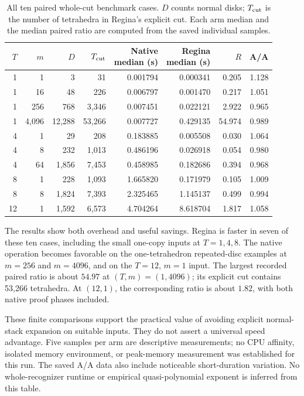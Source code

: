 \begin{table}[htbp]
\centering
\small
\setlength{\tabcolsep}{3.4pt}
\begin{tabular}{@{}rrrrrrrr@{}}
\toprule
$T$ & $m$ & $D$ & $T_{\rm cut}$ &
\shortstack{Native\\median (s)} &
\shortstack{Regina\\median (s)} &
$R$ & A/A \\
\midrule
1 & 1 & 3 & 31 & 0.001794 & 0.000341 & 0.205 & 1.128 \\
1 & 16 & 48 & 226 & 0.006797 & 0.001470 & 0.217 & 1.051 \\
1 & 256 & 768 & 3,346 & 0.007451 & 0.022121 & 2.922 & 0.965 \\
1 & 4,096 & 12,288 & 53,266 & 0.007727 & 0.429135 & 54.974 & 0.989 \\
4 & 1 & 29 & 208 & 0.183885 & 0.005508 & 0.030 & 1.064 \\
4 & 8 & 232 & 1,013 & 0.486196 & 0.026918 & 0.054 & 0.980 \\
4 & 64 & 1,856 & 7,453 & 0.458985 & 0.182686 & 0.394 & 0.968 \\
8 & 1 & 228 & 1,093 & 1.665820 & 0.171979 & 0.105 & 1.009 \\
8 & 8 & 1,824 & 7,393 & 2.325465 & 1.145137 & 0.499 & 0.994 \\
12 & 1 & 1,592 & 6,573 & 4.704264 & 8.618704 & 1.817 & 1.058 \\
\bottomrule
\end{tabular}
\caption{All ten paired whole-cut benchmark cases.  $D$ counts normal disks;
$T_{\rm cut}$ is the number of tetrahedra in Regina's explicit cut.
Each arm median and the median paired ratio are computed from the saved
individual samples.}
\label{main:exp-timing-table}
\end{table}

The results show both overhead and useful savings.  Regina is faster in seven
of these ten cases, including the small one-copy inputs at $T=1,4,8$.
The native operation becomes favorable on the one-tetrahedron repeated-disc
examples at $m=256$ and $m=4096$, and on the $T=12$, $m=1$ input.  The largest
recorded paired ratio is about $54.97$ at $(T,m)=(1,4096)$; its explicit cut
contains 53,266 tetrahedra.  At $(12,1)$, the corresponding ratio is about
$1.82$, with both native proof phases included.

These finite comparisons support the practical value of avoiding explicit
normal-stack expansion on suitable inputs.  They do not assert a universal
speed advantage.  Five samples per arm are descriptive measurements; no CPU
affinity, isolated memory environment, or peak-memory measurement was
established for this run.  The saved A/A data also include noticeable
short-duration variation.  No whole-recognizer runtime or empirical
quasi-polynomial exponent is inferred from this table.


